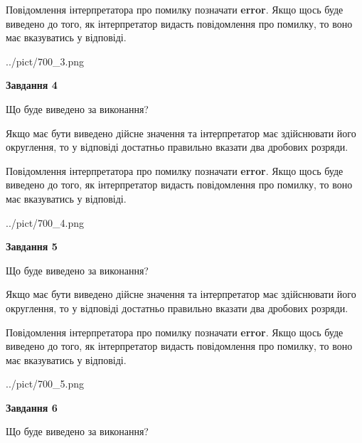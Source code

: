 \documentclass[12pt, ukrainian]{article}
\begin{document}
{\begin {Large}
Повідомлення інтерпретатора про помилку позначати \textbf{error}.
Якщо щось буде виведено до того, як інтерпретатор видасть повідомлення про помилку, 
то воно має вказуватись у відповіді. \par

\begin{center}
	{../pict/700_3.png}
\end{center}
\newpage

{\begin {center}\textbf{Завдання 4}\end {center}}\par
Що буде виведено за виконання? \par

Якщо має бути виведено дійсне значення та інтерпретатор має здійснювати його округлення, 
то у відповіді достатньо правильно вказати два дробових розряди.

Повідомлення інтерпретатора про помилку позначати \textbf{error}.
Якщо щось буде виведено до того, як інтерпретатор видасть повідомлення про помилку, 
то воно має вказуватись у відповіді. \par

\begin{center}
	{../pict/700_4.png}
\end{center}
\newpage

{\begin {center}\textbf{Завдання 5}\end {center}}\par
Що буде виведено за виконання? \par

Якщо має бути виведено дійсне значення та інтерпретатор має здійснювати його округлення, 
то у відповіді достатньо правильно вказати два дробових розряди.

Повідомлення інтерпретатора про помилку позначати \textbf{error}.
Якщо щось буде виведено до того, як інтерпретатор видасть повідомлення про помилку, 
то воно має вказуватись у відповіді. \par

\begin{center}
	{../pict/700_5.png}
\end{center}
\newpage

{\begin {center}\textbf{Завдання 6}\end {center}}\par
Що буде виведено за виконання? \par


\end{Large}}
\end{document}

